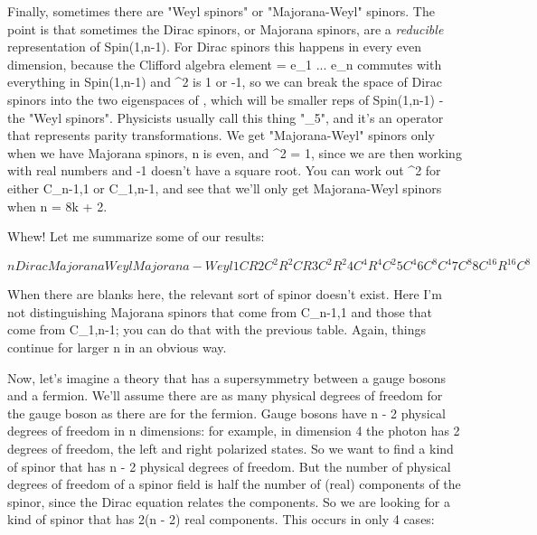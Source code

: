 Finally, sometimes there are "Weyl spinors" or
"Majorana-Weyl" spinors.  The point is that sometimes the
Dirac spinors, or Majorana spinors, are a \emph{reducible}
representation of Spin(1,n-1).  For Dirac spinors this happens in every
even dimension, because the Clifford algebra element 
 \Gamma  =
e_{1} ... e_{n} 
 commutes with everything in
Spin(1,n-1) and \Gamma ^{2} is 1 or -1, so we can break the space
of Dirac spinors into the two eigenspaces of \Gamma , which will be
smaller reps of Spin(1,n-1) - the "Weyl spinors".  Physicists
usually call this \Gamma  thing "\gamma _{5}", and it's an
operator that represents parity transformations.  We get
"Majorana-Weyl" spinors only when we have Majorana spinors, n
is even, and \Gamma ^{2} = 1, since we are then working with real
numbers and -1 doesn't have a square root.  You can work out
\Gamma ^{2} for either C_{n-1,1} or C_{1,n-1},
and see that we'll only get Majorana-Weyl spinors when n = 8k + 2.

Whew!  Let me summarize some of our results:

$$
n    Dirac     Majorana       Weyl    Majorana-Weyl

1     C           R             
2     C^{2}          R^{2}           C           R
3     C^{2}          R^{2} 
4     C^{4}          R^{4}           C^{2}
5     C^{4}        
6     C^{8}                       C^{4}
7     C^{8}
8     C^{16}         R^{16}          C^{8}

$$
    
When there are blanks here, the relevant sort of spinor doesn't
exist.  Here I'm not distinguishing Majorana spinors that come from
C_{n-1,1} and those that come from C_{1,n-1}; you can do that with
the previous table.  Again, things continue for larger n in an obvious
way.  

Now, let's imagine a theory that has a supersymmetry between a gauge
bosons and a fermion.  We'll assume there are as many physical degrees of 
freedom for the gauge boson as there are for the fermion.   Gauge
bosons have n - 2 physical degrees of freedom in n dimensions: for
example, in dimension 4 the photon has 2 degrees of freedom, the left
and right polarized states.  So we want to find a kind of spinor that
has n - 2 physical degrees of freedom.  But the number of physical
degrees of freedom of a spinor field is half the number of (real) 
components of the spinor, since the Dirac equation relates the
components.  So we are looking for a kind of spinor that has 2(n - 2)
real components.  This occurs in only 4 cases:

